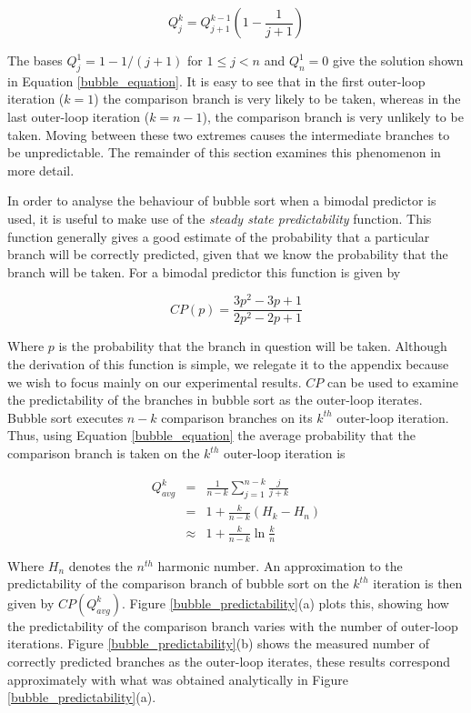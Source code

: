 \documentclass[acmtocl]{acmtrans2m}
\begin{document}
\[
Q^k_j = Q^{k-1}_{j+1}\left(1 - \frac{1}{j + 1} \right)
\] 

\noindent
The bases $Q^{1}_j = 1 - 1 / (j + 1)$ for $1 \leq j < n$ and $Q^1_n = 0$ give the solution shown in Equation \ref{bubble_equation}.
It is easy to see that in the first outer-loop iteration ($k = 1$) the comparison branch is very likely to be taken, whereas in the last
outer-loop iteration ($k = n - 1$), the comparison branch is very unlikely to be taken. Moving between these two extremes causes the intermediate
branches to be unpredictable. The remainder of this section examines this phenomenon in more detail.

In order to analyse the behaviour of bubble sort when a bimodal predictor is used,
it is useful to make use of the \textit{steady state predictability} function. This function
generally gives a good estimate of the probability that a particular branch will be correctly predicted,
given that we know the probability that the branch will be taken. For a bimodal predictor this function is
given by

\begin{equation}
CP(p) = \frac{3p^2 - 3p + 1}{2p^2 - 2p + 1}
\label{CP_equation}
\end{equation}

\noindent
Where $p$ is the probability that the branch in question will be taken. Although the derivation of this
function is simple, we relegate it to the appendix because we wish
to focus mainly on our experimental results. $CP$ can be used to examine the predictability of the branches in bubble sort as the outer-loop iterates.
Bubble sort executes $n - k$ comparison branches on its $k^{th}$ outer-loop iteration. Thus,
using Equation \ref{bubble_equation} the average probability that the comparison branch is taken on the $k^{th}$ outer-loop iteration
is 

\begin{eqnarray*}
Q^k_{avg} &=& \frac{1}{n - k} \sum_{j = 1}^{n - k} \frac{j}{j + k} \\
          &=& 1 + \frac{k}{n - k}(H_k - H_n)\\
         &\approx& 1 + \frac{k}{n - k}\ln\frac{k}{n}
\end{eqnarray*}

\noindent
Where $H_n$ denotes the $n^{th}$ harmonic number. An approximation to the predictability
of the comparison branch of bubble sort on the $k^{th}$ iteration is then given by $CP(Q^k_{avg})$.
Figure \ref{bubble_predictability}(a) plots this, showing how the predictability of the comparison branch varies
with the number of outer-loop iterations. Figure \ref{bubble_predictability}(b)
shows the measured number of correctly predicted branches as the outer-loop iterates, these results
correspond approximately with what was obtained analytically in Figure \ref{bubble_predictability}(a).
\end{document}
